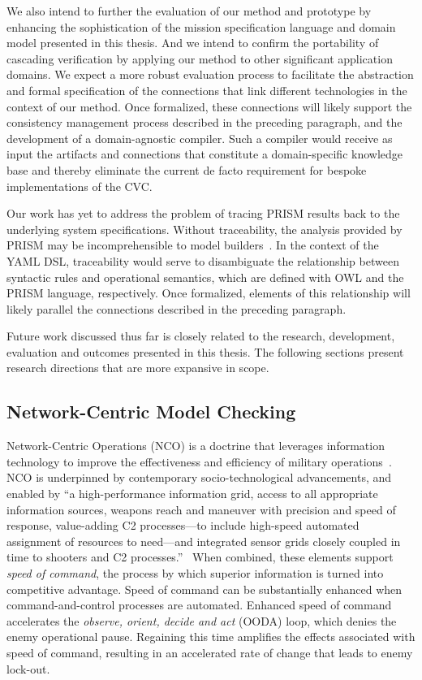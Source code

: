 We also intend to further the evaluation of our method and prototype by enhancing the sophistication of the mission specification language and domain model presented in this thesis. And we intend to confirm the portability of cascading verification by applying our method to other significant application domains. We expect a more robust evaluation process to facilitate the abstraction and formal specification of the connections that link different technologies in the context of our method. Once formalized, these connections will likely support the consistency management process described in the preceding paragraph, and the development of a domain-agnostic compiler. Such a compiler would receive as input the artifacts and connections that constitute a domain-specific knowledge base and thereby eliminate the current de facto requirement for bespoke implementations of the CVC\@.

Our work has yet to address the problem of tracing PRISM results back to the underlying system specifications. Without traceability, the analysis provided by PRISM may be incomprehensible to model builders~\cite{Combemale_2011}. In the context of the YAML DSL, traceability would serve to disambiguate the relationship between syntactic rules and operational semantics, which are defined with OWL and the PRISM language, respectively. Once formalized, elements of this relationship will likely parallel the connections described in the preceding paragraph.

Future work discussed thus far is closely related to the research, development, evaluation and outcomes presented in this thesis. The following sections present research directions that are more expansive in scope.

\subsection{Network-Centric Model Checking}
\label{sec:Network_Centric_Model_Checking}

Network-Centric Operations (NCO) is a doctrine that leverages information technology to improve the effectiveness and efficiency of military operations~\cite{Wilson_2007}. NCO is underpinned by contemporary socio-technological advancements, and enabled by ``a high-performance information grid, access to all appropriate information sources, weapons reach and maneuver with precision and speed of response, value-adding C2 processes---to include high-speed automated assignment of resources to need---and integrated sensor grids closely coupled in time to shooters and C2 processes.''~\cite{Cebrowski_1998} When combined, these elements support \emph{speed of command}, the process by which superior information is turned into competitive advantage. Speed of command can be substantially enhanced when command-and-control processes are automated. Enhanced speed of command accelerates the \emph{observe, orient, decide and act} (OODA) loop, which denies the enemy operational pause. Regaining this time amplifies the effects associated with speed of command, resulting in an accelerated rate of change that leads to enemy lock-out.

